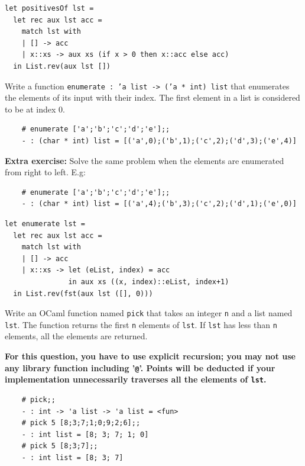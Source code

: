 \documentclass[addpoints]{exam}
\begin{document}
\begin{questions}
  \begin{solutionbox}{4cm}
    \begin{verbatim}
let positivesOf lst =
  let rec aux lst acc =
    match lst with
    | [] -> acc
    | x::xs -> aux xs (if x > 0 then x::acc else acc)
  in List.rev(aux lst [])
    \end{verbatim}
  \end{solutionbox}

  
  \question
  Write a function 
  \texttt{enumerate : 'a list -> ('a * int) list} 
  that enumerates the elements of its input with their index.
  The first element in a list is considered to be at index 0.
  \begin{verbatim}
    # enumerate ['a';'b';'c';'d';'e'];;
    - : (char * int) list = [('a',0);('b',1);('c',2);('d',3);('e',4)]
  \end{verbatim}
  \textbf{Extra exercise:} Solve the same problem when the elements are 
  enumerated from right to left. E.g:
  \begin{verbatim}
    # enumerate ['a';'b';'c';'d';'e'];;
    - : (char * int) list = [('a',4);('b',3);('c',2);('d',1);('e',0)]
  \end{verbatim}

  \begin{solutionbox}{4.5cm}
    \begin{verbatim}
let enumerate lst =
  let rec aux lst acc =
    match lst with
    | [] -> acc
    | x::xs -> let (eList, index) = acc
               in aux xs ((x, index)::eList, index+1)
  in List.rev(fst(aux lst ([], 0)))
    \end{verbatim}
  \end{solutionbox}

  \question
  Write an OCaml function named \texttt{pick} that takes an integer \texttt{n} and
  a list named \texttt{lst}. The function returns the first \texttt{n}
  elements of \texttt{lst}. If \texttt{lst} has less than \texttt{n} elements,
  all the elements are returned.

  \textbf{For this question, you have to use explicit recursion;
    you may not use any library function including '\texttt{@}'.
    Points will be deducted if your implementation unnecessarily traverses all the
    elements of \texttt{lst}.
  }
  \begin{verbatim}
    # pick;;
    - : int -> 'a list -> 'a list = <fun>
    # pick 5 [8;3;7;1;0;9;2;6];;
    - : int list = [8; 3; 7; 1; 0]
    # pick 5 [8;3;7];;          
    - : int list = [8; 3; 7]
  \end{verbatim}
  \strut


\end{questions}
\end{document}

